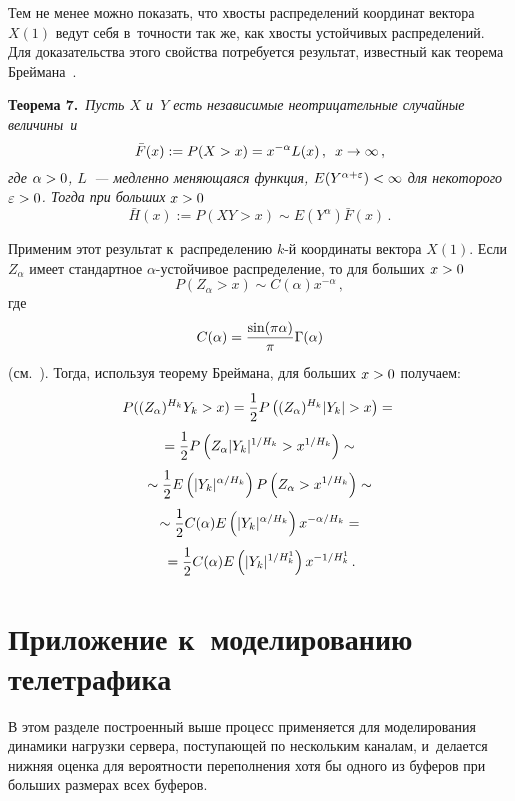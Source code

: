 \begin{multicols}{2}
Тем не менее можно показать, что хвосты распределений координат
вектора $X(1)$ ведут себя в~точности так же, как хвосты устойчивых
распределений. Для доказательства этого свойства потребуется
результат, известный как теорема Бреймана~\cite{Br65}.

\smallskip

\noindent
\textbf{Теорема 7.}\
\textit{Пусть $X$ и~$Y$ есть независимые неотрицательные случайные величины~и
$$
\bar{F} (x) := P(X>x) = x^{-\alpha}  L(x) \,, \enskip x\to\infty \,,
$$
где $\alpha\hm >0$, $L$~--- медленно меняющаяся функция, 
$E(Y^{\alpha + \varepsilon} ) \hm< \infty$ для некоторого
$\varepsilon \hm> 0$. Тогда при больших} $x\hm>0$
$$
\bar{H} (x) := P(XY >x) \sim E(Y^{\alpha} ) \bar{F} (x)  \,.
$$


Применим этот результат к~распределению $k$-й координаты вектора $X(1)$.
Если $Z_{\alpha}$ имеет стандартное $\alpha$-устой\-чи\-вое распределение, то для больших 
$x\hm>0$
$$
 P(Z_{\alpha} > x ) \sim C(\alpha ) x^{-\alpha}  \,,
$$
где
$$
C(\alpha ) = \displaystyle\frac{\displaystyle \sin (\pi\alpha )\mathstrut}{\displaystyle \pi\mathstrut} \Gamma (\alpha )
$$
(см.~\cite[теорема~2.4.1]{IL65}). Тогда, используя теорему
Бреймана, для больших $x\hm>0$ получаем:
\begin{multline*}
P((Z_{\alpha} )^{H_k} Y_k >x) = \displaystyle\frac{\displaystyle 1\mathstrut}{\displaystyle 2\mathstrut} P\left( (Z_{\alpha} )^{H_k} |Y_k | >x \right) =
{}\\
{}=
\displaystyle\frac{\displaystyle 1\mathstrut}{\displaystyle 2\mathstrut} P\left(Z_{\alpha}  |Y_k |^{1/H_k} >x^{1/H_k} \right)\sim{}\\
{}
\sim \displaystyle\frac{\displaystyle 1\mathstrut}{\displaystyle 2\mathstrut} E\left(|Y_k |^{\alpha/H_k} \right)   
P\left( Z_{\alpha}  >x^{1/H_k} \right) \sim{}\\
{}\sim
\displaystyle\frac{\displaystyle 1\mathstrut}{\displaystyle 2\mathstrut} C(\alpha ) E\left(|Y_k |^{\alpha/H_k} \right)  x^{-\alpha/H_k } ={}\\
{}=
\displaystyle\frac{\displaystyle 1\mathstrut}{\displaystyle 2\mathstrut} C(\alpha ) E\left(|Y_k |^{1/H_k^1} \right)  x^{- 1/H_k^1 }  \,.
\end{multline*}


\section{Приложение к~моделированию телетрафика}

В этом разделе построенный выше процесс применяется для
моделирования динамики нагрузки сервера, поступающей по нескольким
каналам, и~делается  нижняя оценка для вероятности переполнения хотя
бы одного из буферов при больших размерах всех буферов.


\end{multicols}
